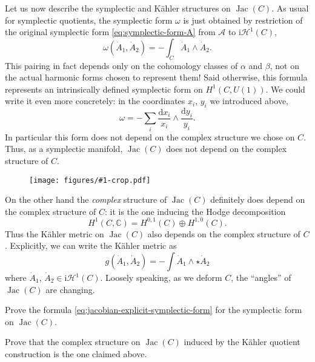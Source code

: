\documentclass[12pt,letterpaper,reqno]{article}
\numberwithin{equation}{section}
\newcommand{\cH}{\ensuremath{\mathcal H}}
\newcommand{\cA}{\ensuremath{\mathcal A}}
\newcommand{\C}{\ensuremath{\mathbb C}}
\newcommand{\kahler}{K\"ahler\xspace}
\newcommand{\I}{{\mathrm i}}
\newcommand{\de}{\mathrm{d}}
\newcommand{\ti}[1]{\textit{#1}}
\DeclareMathOperator{\Jac}{Jac}
\newcommand{\insfig}[2]{\begin{figure}[htbp] \centering \texttt{[image: figures/\#1-crop.pdf]} \label{fig:#1} \end{figure}}
\begin{document}
\begin{example}[Jacobians]
Let us now describe the symplectic and \kahler structures
on $\Jac(C)$.
As usual for symplectic quotients, 
the symplectic form $\omega$ is just obtained by
restriction of the original symplectic form \eqref{eq:symplectic-form-A}
from $\cA$ to $\I \cH^1(C)$,
\begin{equation} \label{eq:symplectic-form-jac}
  \omega(\dot{A}_1, \dot{A}_2) = - \int_C \dot{A}_1 \wedge \dot{A}_2.
\end{equation}
This pairing in fact depends only on the cohomology classes of
$\alpha$ and $\beta$, not on the actual harmonic forms
chosen to represent them! Said otherwise, this formula represents
an intrinsically defined symplectic form on $H^1(C,U(1))$.
We could write it even more concretely: in the coordinates
$x_i$, $y_i$ we introduced above,
\begin{equation} \label{eq:jacobian-explicit-symplectic-form}
	\omega = - \sum_i \frac{\de x_i}{x_i} \wedge \frac{\de y_i}{y_i}.
\end{equation}
In particular this form does not depend on the complex structure
we chose on $C$.
Thus, as a symplectic manifold, $\Jac(C)$ does not depend on
the complex structure of $C$.

\insfig{higgs-bundles-14}{0.9}

On the other hand the
\ti{complex} structure of $\Jac(C)$ 
definitely does depend on the complex
structure of $C$: it is the one inducing the 
Hodge decomposition
\begin{equation}
  H^1(C,\C) = H^{0,1}(C) \oplus H^{1,0}(C).
\end{equation}
Thus the \kahler metric on $\Jac(C)$
also depends on the complex structure of $C$.
Explicitly, we can write the \kahler metric as
\begin{equation}
  g(\dot{A}_1, \dot{A}_2) = - \int \dot{A}_1 \wedge \star \dot{A}_2
\end{equation}
where $\dot{A}_1$, $\dot{A}_2 \in \I \cH^1(C)$.
Loosely speaking, as we deform $C$, the ``angles'' of $\Jac(C)$
are changing.
\end{example}

\begin{exercise} Prove the formula \eqref{eq:jacobian-explicit-symplectic-form}
for the symplectic form on $\Jac(C)$.
\end{exercise}

\begin{exercise}
Prove that the complex structure on $\Jac(C)$
induced by the \kahler quotient construction is the 
one claimed above.
\end{exercise}
\end{document}

